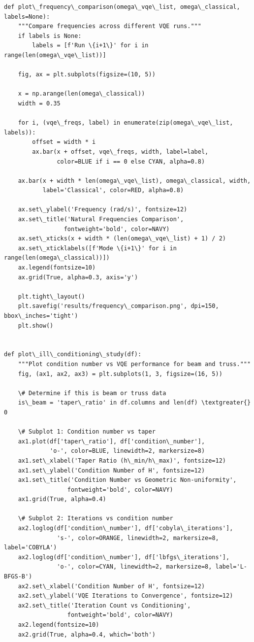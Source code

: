 \documentclass[12pt, a4paper]{article}
\begin{document}
\begin{lstlisting}[style=codestyle, caption={{visualize.py --- Beam and Truss Visualizations}}]
def plot\_frequency\_comparison(omega\_vqe\_list, omega\_classical, labels=None):
    """Compare frequencies across different VQE runs."""
    if labels is None:
        labels = [f'Run \{i+1\}' for i in range(len(omega\_vqe\_list))]

    fig, ax = plt.subplots(figsize=(10, 5))

    x = np.arange(len(omega\_classical))
    width = 0.35

    for i, (vqe\_freqs, label) in enumerate(zip(omega\_vqe\_list, labels)):
        offset = width * i
        ax.bar(x + offset, vqe\_freqs, width, label=label,
               color=BLUE if i == 0 else CYAN, alpha=0.8)

    ax.bar(x + width * len(omega\_vqe\_list), omega\_classical, width,
           label='Classical', color=RED, alpha=0.8)

    ax.set\_ylabel('Frequency (rad/s)', fontsize=12)
    ax.set\_title('Natural Frequencies Comparison',
                 fontweight='bold', color=NAVY)
    ax.set\_xticks(x + width * (len(omega\_vqe\_list) + 1) / 2)
    ax.set\_xticklabels([f'Mode \{i+1\}' for i in range(len(omega\_classical))])
    ax.legend(fontsize=10)
    ax.grid(True, alpha=0.3, axis='y')

    plt.tight\_layout()
    plt.savefig('results/frequency\_comparison.png', dpi=150, bbox\_inches='tight')
    plt.show()


def plot\_ill\_conditioning\_study(df):
    """Plot condition number vs VQE performance for beam and truss."""
    fig, (ax1, ax2, ax3) = plt.subplots(1, 3, figsize=(16, 5))

    \# Determine if this is beam or truss data
    is\_beam = 'taper\_ratio' in df.columns and len(df) \textgreater{} 0

    \# Subplot 1: Condition number vs taper
    ax1.plot(df['taper\_ratio'], df['condition\_number'],
             'o-', color=BLUE, linewidth=2, markersize=8)
    ax1.set\_xlabel('Taper Ratio (h\_min/h\_max)', fontsize=12)
    ax1.set\_ylabel('Condition Number of H', fontsize=12)
    ax1.set\_title('Condition Number vs Geometric Non-uniformity',
                  fontweight='bold', color=NAVY)
    ax1.grid(True, alpha=0.4)

    \# Subplot 2: Iterations vs condition number
    ax2.loglog(df['condition\_number'], df['cobyla\_iterations'],
               's-', color=ORANGE, linewidth=2, markersize=8, label='COBYLA')
    ax2.loglog(df['condition\_number'], df['lbfgs\_iterations'],
               'o-', color=CYAN, linewidth=2, markersize=8, label='L-BFGS-B')
    ax2.set\_xlabel('Condition Number of H', fontsize=12)
    ax2.set\_ylabel('VQE Iterations to Convergence', fontsize=12)
    ax2.set\_title('Iteration Count vs Conditioning',
                  fontweight='bold', color=NAVY)
    ax2.legend(fontsize=10)
    ax2.grid(True, alpha=0.4, which='both')


\end{lstlisting}
\end{document}
